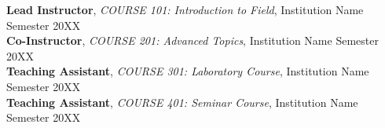 \textbf{Lead Instructor}, \textit{COURSE 101: Introduction to Field}, Institution Name \hfill Semester 20XX \\
\textbf{Co-Instructor}, \textit{COURSE 201: Advanced Topics}, Institution Name \hfill Semester 20XX \\
\textbf{Teaching Assistant}, \textit{COURSE 301: Laboratory Course}, Institution Name \hfill Semester 20XX \\
\textbf{Teaching Assistant}, \textit{COURSE 401: Seminar Course}, Institution Name \hfill Semester 20XX